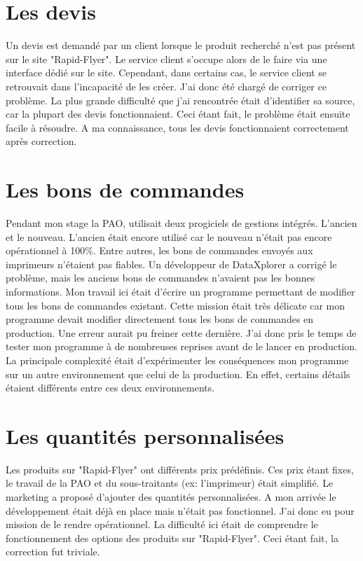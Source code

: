 \section{Les devis}
Un devis est demandé par un client lorsque le produit recherché n'est pas présent sur le site "Rapid-Flyer". Le service client s'occupe alors de le faire via une interface dédié sur le site. Cependant, dans certains cas, le service client se retrouvait dans l'incapacité de les créer.\newline
J'ai donc été chargé de corriger ce problème. La plus grande difficulté que j'ai rencontrée était d'identifier sa source, car la plupart des devis fonctionnaient. Ceci étant fait, le problème était ensuite facile à résoudre. A ma connaissance, tous les devis fonctionnaient correctement après correction.

\section{Les bons de commandes}
Pendant mon stage la PAO, utilisait deux progiciels de gestions intégrés. L'ancien et le nouveau. L'ancien était encore utilisé car le nouveau n'était pas encore opérationnel à 100\%. Entre autres, les bons de commandes envoyés aux imprimeurs n'étaient pas fiables. Un développeur de DataXplorer a corrigé le problème, mais les anciens bons de commandes n'avaient pas les bonnes informations. Mon travail ici était d'écrire un programme permettant de modifier tous les bons de commandes existant. Cette mission était très délicate car mon programme devait modifier directement tous les bons de commandes en production. Une erreur aurait pu freiner cette dernière. J'ai donc pris le temps de tester mon programme à de nombreuses reprises avant de le lancer en production. La principale complexité était d'expérimenter les conséquences mon programme sur un autre environnement que celui de la production. En effet, certains détails étaient différents entre ces deux environnements.

\section{Les quantités personnalisées}
Les produits sur "Rapid-Flyer" ont différents prix prédéfinis. Ces prix étant fixes, le travail de la PAO et du sous-traitants (ex: l'imprimeur) était simplifié.\newline
Le marketing a proposé d'ajouter des quantités personnalisées. A mon arrivée le développement était déjà en place mais n'était pas fonctionnel. J'ai donc eu pour mission de le rendre opérationnel. La difficulté ici était de comprendre le fonctionnement des options des produits sur "Rapid-Flyer". Ceci étant fait, la correction fut triviale.

